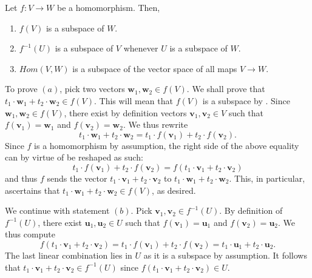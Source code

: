 \begin{lemma}{}{}
 Let $f:V \to W$ be a homomorphism. Then,
 \begin{enumerate}[label=(\alph*)]
  \item $f(V)$ is a subspace of $W$.
  \item $f^{-1}(U)$ is a subspace of $V$ whenever $U$ is a subspace of $W$.
  \item $Hom(V,W)$ is a subspace of the vector space of all maps $V \to W$.
 \end{enumerate}
\end{lemma}
\begin{lemproof}
 To prove $(a)$, pick two vectors $\mathbf{w}_1,\mathbf{w}_2 \in f(V)$. We shall
 prove that $t_1 \cdot \mathbf{w}_1 + t_2 \cdot \mathbf{w}_2 \in f(V)$. This
 will mean that $f(V)$ is a subspace by
 . Since
 $\mathbf{w}_1,\mathbf{w}_2 \in f(V)$, there exist by definition vectors
 $\mathbf{v}_1,\mathbf{v}_2 \in V$ such that $f(\mathbf{v}_1) = \mathbf{w}_1$
 and $f(\mathbf{v}_2) = \mathbf{w}_2$. We thus rewrite
 \[
  t_1 \cdot \mathbf{w}_1 + t_2 \cdot \mathbf{w}_2 = t_1 \cdot f(\mathbf{v}_1) +
  t_2 \cdot f(\mathbf{v}_2).
 \]
 Since $f$ is a homomorphism by assumption, the right side of the above equality
 can by virtue of  be reshaped as such:
 \[
  t_1 \cdot f(\mathbf{v}_1) + t_2 \cdot f(\mathbf{v}_2) = f(t_1 \cdot
  \mathbf{v}_1 + t_2 \cdot \mathbf{v}_2)
 \]
 and thus $f$ sends the vector $t_1 \cdot \mathbf{v}_1 + t_2 \cdot \mathbf{v}_2$
 to $t_1 \cdot \mathbf{w}_1 + t_2 \cdot \mathbf{w}_2$. This, in particular,
 ascertains that $t_1 \cdot \mathbf{w}_1 + t_2 \cdot \mathbf{w}_2 \in f(V)$, as
 desired.

 We continue with statement $(b)$. Pick $\mathbf{v}_1,\mathbf{v}_2 \in
 f^{-1}(U)$. By definition of $f^{-1}(U)$, there exist
 $\mathbf{u}_1,\mathbf{u}_2 \in U$ such that $f(\mathbf{v}_1) = \mathbf{u}_1$
 and $f(\mathbf{v}_2) = \mathbf{u}_2$. We thus compute
 \[
  f(t_1 \cdot \mathbf{v}_1 + t_2 \cdot \mathbf{v}_2) = t_1 \cdot f(\mathbf{v}_1)
  + t_2 \cdot f(\mathbf{v}_2) = t_1 \cdot \mathbf{u}_1 + t_2 \cdot \mathbf{u}_2.
 \]
 The last linear combination lies in $U$ as it is a subspace by assumption. It
 follows that $t_1 \cdot \mathbf{v}_1 + t_2 \cdot \mathbf{v}_2 \in f^{-1}(U)$
 since $f(t_1 \cdot \mathbf{v}_1 + t_2 \cdot \mathbf{v}_2) \in U$.


\end{lemproof}
